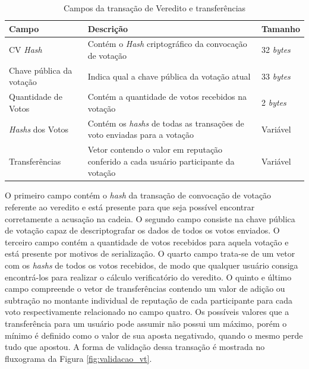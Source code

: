 \begin{table}[ht]
\centering
    \begin{tabular}{|m{}|m{}|m{}|}
    \hline
         \textbf{Campo} & \textbf{Descrição} & \textbf{Tamanho}  \\
         \hline
         \ac{CV} \textit{Hash} & Contém o \textit{Hash} criptográfico da convocação de votação & 32 \textit{bytes} \\
         \hline
         Chave pública da votação & Indica qual a chave pública da votação atual & 33 \textit{bytes} \\
         \hline
         Quantidade de Votos & Contém a quantidade de votos recebidos na votação & 2 \textit{bytes}\\
         \hline
         \textit{Hashs} dos Votos & Contém os \textit{hashs} de todas as transações de voto enviadas para a votação & Variável\\
         \hline
         Transferências & Vetor contendo o valor em reputação conferido a cada usuário participante da votação & Variável \\
    \hline
    \end{tabular}
    \caption{Campos da transação de Veredito e transferências}
    \label{tabela:vt}
\end{table}

O primeiro campo contém o \textit{hash} da transação de convocação de votação referente ao veredito e está presente para que seja possível encontrar corretamente a acusação na cadeia. O segundo campo consiste na chave pública de votação capaz de descriptografar os dados de todos os votos enviados. O terceiro campo contém a quantidade de votos recebidos para aquela votação e está presente por motivos de serialização. O quarto campo trata-se de um vetor com os \textit{hashs} de todos os votos recebidos, de modo que qualquer usuário consiga encontrá-los para realizar o cálculo verificatório do veredito. O quinto e último campo compreende o vetor de transferências contendo um valor de adição ou subtração no montante individual de reputação de cada participante para cada voto respectivamente relacionado no campo quatro. Os possíveis valores que a transferência para um usuário pode assumir não possui um máximo, porém o mínimo é definido como o valor de sua aposta negativado, quando o mesmo perde tudo que apostou. A forma de validação dessa transação é mostrada no fluxograma da Figura \ref{fig:validacao_vt}.

